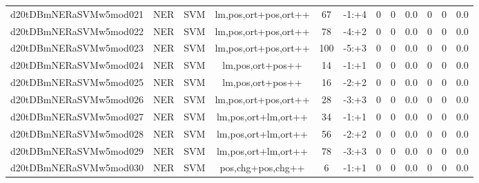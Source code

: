 \documentclass[a4paper]{article}
\begin{document}
\begin{landscape}
\begin{center}
\begin{tabular}{ |c|c|c|c|c|c|c|c|c|c|c|c|}
 
 	
 	\small{ d20tDBmNERaSVMw5mod021 } & \small{ NER} & \small{  SVM }  & lm,pos,ort+pos,ort++  &  67 &  \small{  -1:+4 }  &  0 & 0 & 0.0  &  0 & 0 & 0.0 \\
 	

 
 	
 	\small{ d20tDBmNERaSVMw5mod022 } & \small{ NER} & \small{  SVM }  & lm,pos,ort+pos,ort++  &  78 &  \small{  -4:+2 }  &  0 & 0 & 0.0  &  0 & 0 & 0.0 \\
 	

 
 	
 	\small{ d20tDBmNERaSVMw5mod023 } & \small{ NER} & \small{  SVM }  & lm,pos,ort+pos,ort++  &  100 &  \small{  -5:+3 }  &  0 & 0 & 0.0  &  0 & 0 & 0.0 \\
 	

 
 	
 	\small{ d20tDBmNERaSVMw5mod024 } & \small{ NER} & \small{  SVM }  & lm,pos,ort+pos++  &  14 &  \small{  -1:+1 }  &  0 & 0 & 0.0  &  0 & 0 & 0.0 \\
 	

 
 	
 	\small{ d20tDBmNERaSVMw5mod025 } & \small{ NER} & \small{  SVM }  & lm,pos,ort+pos++  &  16 &  \small{  -2:+2 }  &  0 & 0 & 0.0  &  0 & 0 & 0.0 \\
 	

 
 	
 	\small{ d20tDBmNERaSVMw5mod026 } & \small{ NER} & \small{  SVM }  & lm,pos,ort+pos,ort++  &  28 &  \small{  -3:+3 }  &  0 & 0 & 0.0  &  0 & 0 & 0.0 \\
 	

 
 	
 	\small{ d20tDBmNERaSVMw5mod027 } & \small{ NER} & \small{  SVM }  & lm,pos,ort+lm,ort++  &  34 &  \small{  -1:+1 }  &  0 & 0 & 0.0  &  0 & 0 & 0.0 \\
 	

 
 	
 	\small{ d20tDBmNERaSVMw5mod028 } & \small{ NER} & \small{  SVM }  & lm,pos,ort+lm,ort++  &  56 &  \small{  -2:+2 }  &  0 & 0 & 0.0  &  0 & 0 & 0.0 \\
 	

 
 	
 	\small{ d20tDBmNERaSVMw5mod029 } & \small{ NER} & \small{  SVM }  & lm,pos,ort+lm,ort++  &  78 &  \small{  -3:+3 }  &  0 & 0 & 0.0  &  0 & 0 & 0.0 \\
 	

 
 	
 	\small{ d20tDBmNERaSVMw5mod030 } & \small{ NER} & \small{  SVM }  & pos,chg+pos,chg++  &  6 &  \small{  -1:+1 }  &  0 & 0 & 0.0  &  0 & 0 & 0.0 \\
 	


\end{tabular}
\end{center}
\end{landscape}
\end{document}
